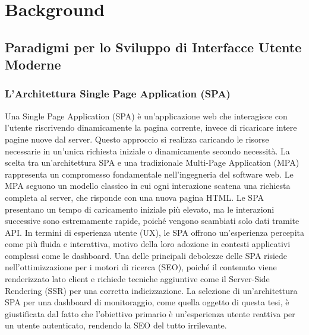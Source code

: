 \documentclass[12pt,a4paper,openright,twoside]{book}
\begin{document}
\chapter{Background}
\label{chap:background}

\section{Paradigmi per lo Sviluppo di Interfacce Utente Moderne}

\subsection{L'Architettura Single Page Application (SPA)}
Una Single Page Application (SPA) è un'applicazione web che interagisce con l'utente riscrivendo dinamicamente la pagina corrente, invece di ricaricare intere pagine nuove dal server. Questo approccio si realizza caricando le risorse necessarie in un'unica richiesta iniziale o dinamicamente secondo necessità. La scelta tra un'architettura SPA e una tradizionale Multi-Page Application (MPA) rappresenta un compromesso fondamentale nell'ingegneria del software web. Le MPA seguono un modello classico in cui ogni interazione scatena una richiesta completa al server, che risponde con una nuova pagina HTML. Le SPA presentano un tempo di caricamento iniziale più elevato, ma le interazioni successive sono estremamente rapide, poiché vengono scambiati solo dati tramite API. In termini di esperienza utente (UX), le SPA offrono un'esperienza percepita come più fluida e interattiva, motivo della loro adozione in contesti applicativi complessi come le dashboard. Una delle principali debolezze delle SPA risiede nell'ottimizzazione per i motori di ricerca (SEO), poiché il contenuto viene renderizzato lato client e richiede tecniche aggiuntive come il Server-Side Rendering (SSR) per una corretta indicizzazione. La selezione di un'architettura SPA per una dashboard di monitoraggio, come quella oggetto di questa tesi, è giustificata dal fatto che l'obiettivo primario è un'esperienza utente reattiva per un utente autenticato, rendendo la SEO del tutto irrilevante.
\end{document}
